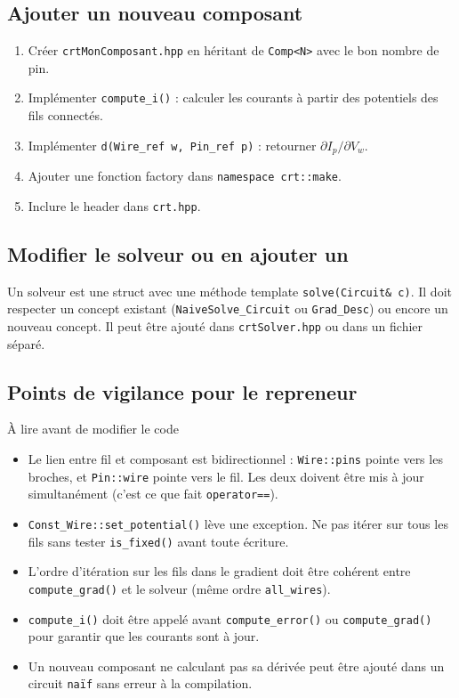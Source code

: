 \documentclass[12pt,a4paper]{article}
\begin{document}
\subsection{Ajouter un nouveau composant}

\begin{enumerate}
  \item Créer \texttt{crtMonComposant.hpp} en héritant de \texttt{Comp<N>} avec le bon nombre de pin.
  \item Implémenter \texttt{compute\_i()} : calculer les courants à partir des potentiels des fils connectés.
  \item Implémenter \texttt{d(Wire\_ref w, Pin\_ref p)} : retourner $\partial I_p / \partial V_w$.
  \item Ajouter une fonction factory dans \texttt{namespace crt::make}.
  \item Inclure le header dans \texttt{crt.hpp}.
\end{enumerate}

\subsection{Modifier le solveur ou en ajouter un}

Un solveur est une struct avec une méthode template \texttt{solve(Circuit\& c)}.
Il doit respecter un concept existant (\texttt{NaiveSolve\_Circuit} ou \texttt{Grad\_Desc}) ou encore un nouveau concept. Il peut être ajouté dans \texttt{crtSolver.hpp} ou dans
un fichier séparé.

\subsection{Points de vigilance pour le repreneur}

\begin{warningbox}{À lire avant de modifier le code}
\begin{itemize}
  \item Le lien entre fil et composant est bidirectionnel : \texttt{Wire::pins} pointe
        vers les broches, et \texttt{Pin::wire} pointe vers le fil. Les deux doivent
        être mis à jour simultanément (c'est ce que fait \texttt{operator==}).
  \item \texttt{Const\_Wire::set\_potential()} lève une exception. Ne pas itérer
        sur tous les fils sans tester \texttt{is\_fixed()} avant toute écriture.
  \item L'ordre d'itération sur les fils dans le gradient doit être cohérent entre
        \texttt{compute\_grad()} et le solveur (même ordre \texttt{all\_wires}).
  \item \texttt{compute\_i()} doit être appelé avant \texttt{compute\_error()} ou
        \texttt{compute\_grad()} pour garantir que les courants sont à jour.
  \item Un nouveau composant ne calculant pas sa dérivée peut être ajouté dans un circuit \texttt{naïf} sans erreur à la compilation.

\end{itemize}
\end{warningbox}
\end{document}
